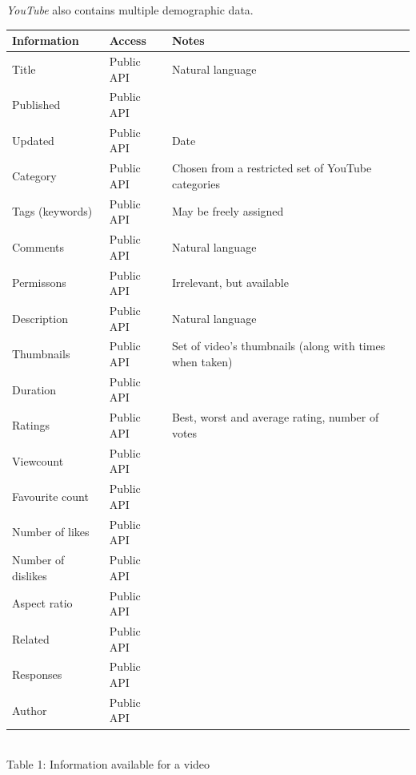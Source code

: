 \textit{YouTube} also contains multiple demographic data.

\begin{center}
  \begin{tabular}{|p{3cm} | l | p{4cm}|} \hline
  Information & Access & Notes\\ \hline
  Title & Public API & Natural language \\
  Published & Public API & \\
  Updated & Public API & Date \\
  Category & Public API & Chosen from a restricted set of YouTube categories \\
  Tags (keywords) & Public API & May be freely assigned \\
  Comments & Public API & Natural language \\
  Permissons & Public API & Irrelevant, but available \\
  Description & Public API & Natural language \\
  Thumbnails & Public API & Set of video's thumbnails (along with times
  when taken) \\
  Duration & Public API & \\
  Ratings & Public API & Best, worst and average rating, number of votes \\
  Viewcount & Public API & \\
  Favourite count & Public API & \\
  Number of likes & Public API & \\
  Number of dislikes & Public API & \\
  Aspect ratio & Public API & \\
  Related & Public API & \\
  Responses & Public API & \\
  Author & Public API & \\ \hline
  \end{tabular} \\
  Table 1: Information available for a video \\
\end{center}

